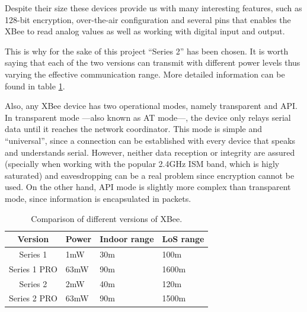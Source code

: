 Despite their size these devices provide us with many interesting features, such as 128-bit encryption, over-the-air configuration and several pins that enables the XBee to read analog values as well as working with digital input and output\citep{xbeedatasheet}.

This is why for the sake of this project ``Series 2'' has been chosen. It is worth saying that each of the two versions can transmit with different power levels thus varying the effective communication range\citep{faludi2010building}. More detailed information can be found in table \ref{tab:xbee_versions}.

Also, any XBee\textregistered{} device has two operational modes, namely transparent and API. In transparent mode ---also known as AT mode---, the device only relays serial data until it reaches the network coordinator. This mode is simple and ``universal'', since a connection can be established with every device that speaks and understands serial. However, neither data reception or integrity are assured (specially when working with the popular 2.4GHz ISM band, which is higly saturated) and eavesdropping can be a real problem since encryption cannot be used. On the other hand, API mode is slightly more complex than transparent mode, since information is encapsulated in packets.

\begin{table}[ht] 
\centering
\begin{tabular}{c|l l l}
    Version     & Power                 & Indoor range     & LoS range\footnotemark[7]\\
\hline
Series 1        & 1mW                   & 30m              & 100m\\
Series 1 PRO    & 63mW\footnotemark[8]  & 90m              & 1600m\\
Series 2        & 2mW                   & 40m              & 120m\\
Series 2 PRO    & 63mW\footnotemark[8]  & 90m              & 1500m\\
\end{tabular}
\caption{Comparison of different versions of XBee\textregistered.}
\label{tab:xbee_versions}
\end{table}


